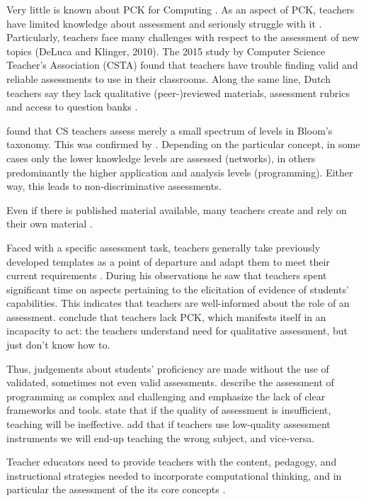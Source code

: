 Very little is known about PCK for Computing \cite{Yadav2016}. As an aspect of PCK, teachers have limited knowledge about assessment and seriously struggle with it \cite{popham2009assessment}. Particularly, teachers face many challenges with respect to the assessment of new topics (DeLuca and Klinger, 2010). The 2015 study by Computer Science Teacher's Association (CSTA) found that teachers have trouble finding valid and reliable assessments to use in their classrooms. Along the same line, Dutch teachers say they lack qualitative (peer-)reviewed materials, assessment rubrics and access to question banks \cite{tolboom2014informatica}.


 found that CS teachers assess merely a small spectrum of levels in Bloom's taxonomy. This was confirmed by . Depending on the particular concept, in some cases only the lower knowledge levels are assessed (networks), in others predominantly the higher application and analysis levels (programming). Either way, this leads to non-discriminative assessments.


Even if there is published material available, many teachers create and rely on their own material \cite{popham2009assessment}.

Faced with a specific assessment task, teachers generally take previously developed templates as a point of departure and adapt them to meet their current requirements \cite{hermansen2014reworking}. During his observations he saw that teachers spent significant time on aspects pertaining to the elicitation of evidence of students' capabilities. This indicates that teachers are well-informed about the role of an assessment.  conclude that teachers lack PCK, which manifests itself in an incapacity to act: the teachers understand need for qualitative assessment, but just don't know how to.



Thus, judgements about students' proficiency are made without the use of validated, sometimes not even valid assessments.  describe the assessment of programming as complex and challenging and emphasize the lack of clear frameworks and tools.  state that if the quality of assessment is insufficient, teaching will be ineffective.  add that if teachers use low-quality assessment instruments we will end-up teaching the wrong subject, and vice-versa.


Teacher educators need to provide teachers with the content, pedagogy, and instructional strategies needed to incorporate computational thinking, and in particular the assessment of the its core concepts \cite{Yadav2017CTteacherEd}.








